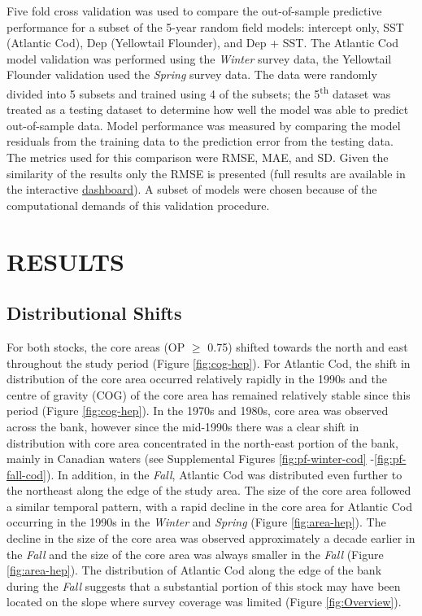 \documentclass[
]{article}
\begin{document}
Five fold cross validation was used to compare the out-of-sample predictive performance for a subset of the 5-year random field models: intercept only, SST (Atlantic Cod), Dep (Yellowtail Flounder), and Dep + SST. The Atlantic Cod model validation was performed using the \emph{Winter} survey data, the Yellowtail Flounder validation used the \emph{Spring} survey data. The data were randomly divided into 5 subsets and trained using 4 of the subsets; the 5\textsuperscript{th} dataset was treated as a testing dataset to determine how well the model was able to predict out-of-sample data. Model performance was measured by comparing the model residuals from the training data to the prediction error from the testing data. The metrics used for this comparison were RMSE, MAE, and SD. Given the similarity of the results only the RMSE is presented (full results are available in the interactive \href{https://github.com/Dave-Keith/Paper_2_SDMs/tree/master/Dashboard}{dashboard}). A subset of models were chosen because of the computational demands of this validation procedure.

\hypertarget{ref-results}{%
\section{RESULTS}\label{ref-results}}

\hypertarget{distributional-shifts}{%
\subsection{Distributional Shifts}\label{distributional-shifts}}

For both stocks, the core areas (OP \(\geq\) 0.75) shifted towards the north and east throughout the study period (Figure \ref{fig:cog-hep}). For Atlantic Cod, the shift in distribution of the core area occurred relatively rapidly in the 1990s and the centre of gravity (COG) of the core area has remained relatively stable since this period (Figure \ref{fig:cog-hep}). In the 1970s and 1980s, core area was observed across the bank, however since the mid-1990s there was a clear shift in distribution with core area concentrated in the north-east portion of the bank, mainly in Canadian waters (see Supplemental Figures \ref{fig:pf-winter-cod} -\ref{fig:pf-fall-cod}). In addition, in the \emph{Fall}, Atlantic Cod was distributed even further to the northeast along the edge of the study area. The size of the core area followed a similar temporal pattern, with a rapid decline in the core area for Atlantic Cod occurring in the 1990s in the \emph{Winter} and \emph{Spring} (Figure \ref{fig:area-hep}). The decline in the size of the core area was observed approximately a decade earlier in the \emph{Fall} and the size of the core area was always smaller in the \emph{Fall} (Figure \ref{fig:area-hep}). The distribution of Atlantic Cod along the edge of the bank during the \emph{Fall} suggests that a substantial portion of this stock may have been located on the slope where survey coverage was limited (Figure \ref{fig:Overview}).
\end{document}
